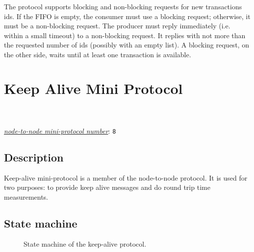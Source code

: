 The protocol supports blocking and non-blocking requests for new transactions ids.
If the FIFO is empty, the consumer must use a blocking request; otherwise, it must be a non-blocking request.
The producer must reply immediately (i.e. within a small timeout) to a non-blocking request.
It replies with not more than the requested number of ids (possibly with an empty list).
A blocking request, on the other side, waits until at least one transaction is available.

\section{Keep Alive Mini Protocol}
\\
\\
\hyperref[table:node-to-node-protocol-numbers]{\textit{node-to-node mini-protocol number}}: \texttt{8}\\

\label{keep-alive-protocol}
\subsection{Description}
Keep-alive mini-protocol is a member of the node-to-node protocol.  It is used for
two purposes: to provide keep alive messages and do round trip time
measurements.

\newcommand{\StClient}{\state{StClient}}
\newcommand{\StServer}{\state{StServer}}
\newcommand{\MsgKeepAlive}{\trans{MsgKeepAlive}}
\newcommand{\MsgKeepAliveResponse}{\trans{MsgKeepAliveResponse}}
\subsection{State machine}

\begin{figure}[h]
  \caption{State machine of the keep-alive protocol.}
\end{figure}

